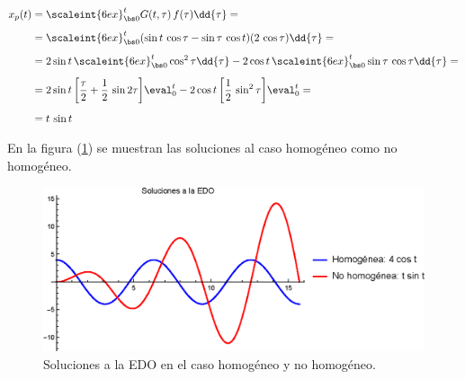 \begin{ejemplo}
\begin{align}
\begin{aligned}[b]
x_{p} (t) &= \scaleint{6ex}_{\bs 0}^{t} G (t, \tau) \, f (\tau) \dd{\tau} = \\[0.5em]
&= \scaleint{6ex}_{\bs 0}^{t} (\sin t \, \cos \tau - \sin \tau \, \cos t) (2 \, \cos \tau) \dd{\tau} = \\[0.5em]
&= 2 \sin t \, \scaleint{6ex}_{\bs 0}^{t} \cos^{2} \tau \dd{\tau} - 2 \cos t \, \scaleint{6ex}_{\bs 0}^{t} \sin \tau \, \cos \tau \dd{\tau} = \\[0.5em]
&= 2 \sin t \, \bigg[ \dfrac{\tau}{2} + \dfrac{1}{2} \, \sin 2 \tau \bigg] \eval_{0}^{t} - 2 \cos t \, \bigg[ \dfrac{1}{2} \, \sin^{2} \tau \bigg] \eval_{0}^{t} = \\[0.5em]
&= t \, \sin t
\end{aligned}
\label{eq:ecuacion_07_24}
\end{align}

En la figura (\ref{fig:figura_01}) se muestran las soluciones al caso homogéneo como no homogéneo.
\begin{figure}[H]
    \centering
    \includegraphics[scale=1]{Imagenes/Plot_Oscilador_Forzado_Green_01.eps}
    \caption{Soluciones a la EDO en el caso homogéneo y no homogéneo.}
    \label{fig:figura_01}
\end{figure}


\end{ejemplo}

